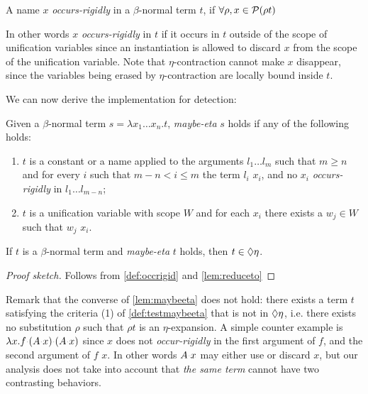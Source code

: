 \documentclass[sigconf,natbib=false,review]{acmart}
\newcommand{\appsep}{\ensuremath{\textcolor{lightgray}{\cdot}}}
\newcommand{\llambda}{\ensuremath{\mathcal{L}_\lambda}\xspace}
\begin{document}

\newcommand{\occursrigid}{\emph{occurs-rigidly}}
\newcommand{\occurrigid}{\emph{occur-rigidly}}
\begin{definition}[\occursrigid]\label{def:occrigid}
  A name $x$ \occursrigid{} in a $\beta$-normal term $t$, if $\forall \rho, x \in
  \mathcal{P}(\rho t)$
\end{definition}

In other words $x$ \emph{\occursrigid} in $t$ if it occurs in $t$
outside of the scope of unification variables since an instantiation
is allowed to discard $x$ from the scope of the unification variable.
Note that $\eta$-contraction cannot make $x$ disappear, since the
variables being erased by $\eta$-contraction are locally bound inside $t$.

We can now derive the implementation for \maybeeta detection:

\newcommand{\testmaybeeta}{\emph{maybe-eta}\xspace}
\begin{definition}[\testmaybeeta]\label{def:testmaybeeta}
  Given a $\beta$-normal term
  $s = \lambda x_1 \ldots x_n.t$, \testmaybeeta{} $s$ holds if any
  of the following holds:
  \begin{enumerate}
    \item $t$ is a constant or a name applied to the arguments
      $l_1 \ldots l_m$ such that 
      $m \geq n$ and for every $i$ such that $m - n < i \leq m$
      the term  $l_i$
      \reduceto{} $x_i$, and
      no $x_i$ \occursrigid{} in $l_1 \ldots l_{m-n}$;
    \item $t$ is a
      unification variable with scope $W$ and
      for each $x_i$ there exists a $w_j \in W$ such that $w_j$
      \reduceto{} $x_i$.
  \end{enumerate}
\end{definition}
\begin{lemma}\label{lem:maybeeta}
  If $t$ is a $\beta$-normal term and \testmaybeeta{} $t$ holds,
  then $t \in \Diamond\eta$.
\end{lemma}
\begin{proof}[Proof sketch]
Follows from \cref{def:occrigid} and \cref{lem:reduceto}
\end{proof}

\noindent
Remark that the converse of \cref{lem:maybeeta} does not hold: 
there exists a term $t$ satisfying the criteria (1) of
\cref{def:testmaybeeta} that is not in $\Diamond\eta$, i.e.
there exists no substitution $\rho$ such that $\rho t$ is an
$\eta$-expansion. A simple counter example is
$\lambda x. f \appsep (A \appsep x) \appsep (A \appsep x)$
since $x$ does not \occurrigid{} in the first argument
of $f$,
and the second argument of $f$ \reduceto{} $x$.
In other words $A \appsep x$
may either use or discard $x$, but our analysis does not
take into account that \emph{the same
term} cannot have two contrasting behaviors.
\end{document}
